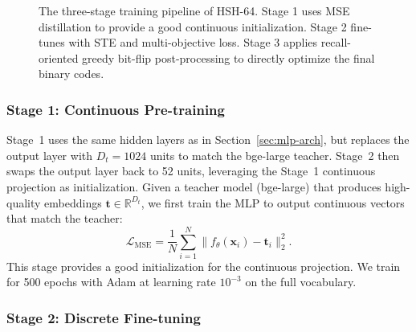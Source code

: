 \documentclass[11pt,a4paper]{article}
\begin{document}
\begin{figure}[htbp]
\caption{The three-stage training pipeline of HSH-64. Stage 1 uses MSE distillation to provide a good continuous initialization. Stage 2 fine-tunes with STE and multi-objective loss. Stage 3 applies recall-oriented greedy bit-flip post-processing to directly optimize the final binary codes.}
\label{fig:pipeline}
\end{figure}

\subsubsection{Stage 1: Continuous Pre-training}\label{sec:stage1}

Stage~1 uses the same hidden layers as in Section~\ref{sec:mlp-arch}, but replaces the output layer with $D_t=1024$ units to match the bge-large teacher. Stage~2 then swaps the output layer back to 52 units, leveraging the Stage~1 continuous projection as initialization. Given a teacher model (bge-large) that produces high-quality embeddings $\mathbf{t} \in \mathbb{R}^{D_t}$, we first train the MLP to output continuous vectors that match the teacher:
\begin{equation}
    \mathcal{L}_{\text{MSE}} = \frac{1}{N} \sum_{i=1}^{N} \| f_\theta(\mathbf{x}_i) - \mathbf{t}_i \|_2^2.
\end{equation}
This stage provides a good initialization for the continuous projection. We train for 500 epochs with Adam at learning rate $10^{-3}$ on the full vocabulary.

\subsubsection{Stage 2: Discrete Fine-tuning}\label{sec:stage2}
\end{document}
